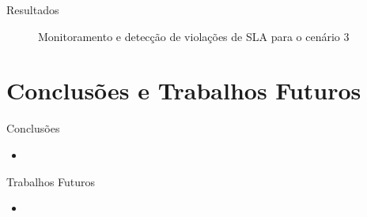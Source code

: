 \documentclass[xcolor=svgnames]{beamer}
\begin{document}
\begin{frame}{Resultados}
{\begin{figure}[H]
	  \caption{ Monitoramento e detecção de violações de SLA para o cenário 3 }
	  \label{figure:detection4-105_10_105}
      \end{figure}
    }

  \end{frame}
  


\section{Conclusões e Trabalhos Futuros}
  \begin{frame}{Conclusões}
      \begin{itemize}
      \item 
      \end{itemize}

  \end{frame}


  \begin{frame}{Trabalhos Futuros}
      \begin{itemize}
      \item 
      \end{itemize}
  \end{frame}
  




\end{document}

